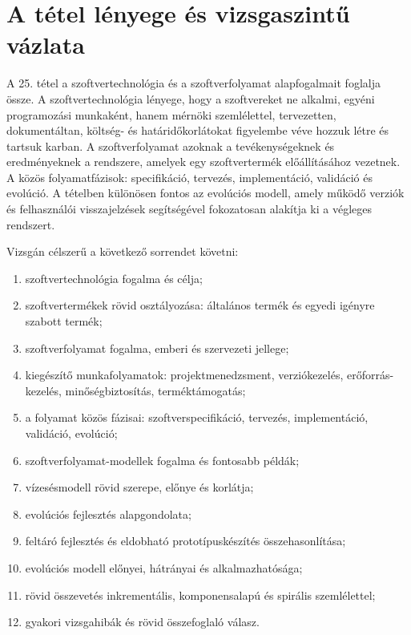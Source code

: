 \section{A tétel lényege és vizsgaszintű vázlata}

\begin{summarybox}
A 25. tétel a szoftvertechnológia és a szoftverfolyamat alapfogalmait foglalja össze. A szoftvertechnológia lényege, hogy a szoftvereket ne alkalmi, egyéni programozási munkaként, hanem mérnöki szemlélettel, tervezetten, dokumentáltan, költség- és határidőkorlátokat figyelembe véve hozzuk létre és tartsuk karban. A szoftverfolyamat azoknak a tevékenységeknek és eredményeknek a rendszere, amelyek egy szoftvertermék előállításához vezetnek. A közös folyamatfázisok: specifikáció, tervezés, implementáció, validáció és evolúció. A tételben különösen fontos az evolúciós modell, amely működő verziók és felhasználói visszajelzések segítségével fokozatosan alakítja ki a végleges rendszert.
\end{summarybox}

Vizsgán célszerű a következő sorrendet követni:

\begin{enumerate}
  \item szoftvertechnológia fogalma és célja;
  \item szoftvertermékek rövid osztályozása: általános termék és egyedi igényre szabott termék;
  \item szoftverfolyamat fogalma, emberi és szervezeti jellege;
  \item kiegészítő munkafolyamatok: projektmenedzsment, verziókezelés, erőforrás-kezelés, minőségbiztosítás, terméktámogatás;
  \item a folyamat közös fázisai: szoftverspecifikáció, tervezés, implementáció, validáció, evolúció;
  \item szoftverfolyamat-modellek fogalma és fontosabb példák;
  \item vízesésmodell rövid szerepe, előnye és korlátja;
  \item evolúciós fejlesztés alapgondolata;
  \item feltáró fejlesztés és eldobható prototípuskészítés összehasonlítása;
  \item evolúciós modell előnyei, hátrányai és alkalmazhatósága;
  \item rövid összevetés inkrementális, komponensalapú és spirális szemlélettel;
  \item gyakori vizsgahibák és rövid összefoglaló válasz.
\end{enumerate}

